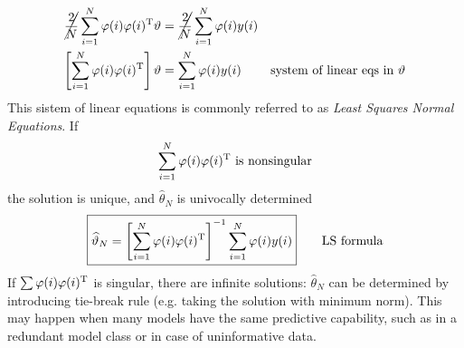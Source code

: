 \begin{align*}
\cancel{\frac{2}{N}}\sum _{i=1}^{N} \varphi (i) \varphi (i)^{\mathrm{T}} \vartheta  & =\cancel{\frac{2}{N}}\sum _{i=1}^{N} \varphi (i) y(i) & \\
\left[\sum _{i=1}^{N} \varphi (i) \varphi (i)^{\mathrm{T}}\right] \vartheta  & =\sum _{i=1}^{N} \varphi (i) y(i) & \text{system of linear eqs in} \ \vartheta 
\end{align*}
This sistem of linear equations is commonly referred to as \textit{Least Squares Normal Equations}. If 
\begin{equation*}
\sum _{i=1}^{N} \varphi (i) \varphi (i)^{\mathrm{T}} \ \text{is nonsingular}
\end{equation*}
the solution is unique, and $ \hat{\theta }_{N}$ is univocally determined
\begin{equation*}
\boxed{\widehat{\vartheta }_{N} =\left[\sum _{i=1}^{N} \varphi (i) \varphi (i)^{\mathrm{T}}\right]^{-1}\sum _{i=1}^{N} \varphi (i) y(i)}
\qquad \text{LS formula}
\end{equation*}
If $ \sum \varphi (i) \varphi (i)^{\mathrm{T}}$ is singular, there are infinite solutions: $ \hat{\theta }_{N}$ can be determined by introducing tie-break rule (e.g. taking the solution with minimum norm). This may happen when many models have the same predictive capability, such as in a redundant model class or in case of uninformative data.

